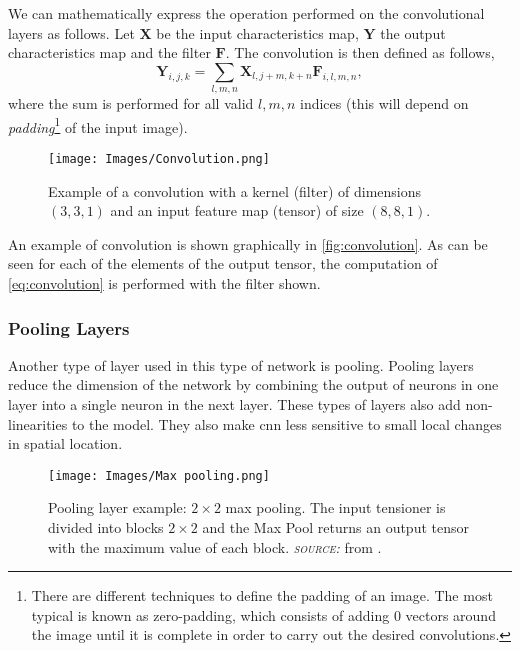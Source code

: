 We can mathematically express the operation performed on the convolutional
layers as follows. Let \(\mathbf{X}\) be the input characteristics map,
\(\mathbf{Y}\) the output characteristics map and the filter
\(\mathbf{F}\). The convolution is then defined as follows,
\begin{equation} \label{eq:convolution}
  \mathbf{Y}_{i, j, k} =
  \sum_{l, m, n} \mathbf{X}_{l, j + m, k + n}\mathbf{F}_{i, l, m, n},
\end{equation}
where the sum is performed for all valid \(l, m, n\) indices (this will depend
on \emph{padding}\footnote{There are different techniques to define the
  padding of an image. The most typical is known as zero-padding, which
  consists of adding 0 vectors around the image until it is complete in order
  to carry out the desired convolutions.} of the input image).

\begin{figure}[ht]
  \centering
  \texttt{[image: Images/Convolution.png]}
  \caption[Example of a convolution]{Example of a convolution with a kernel
    (filter) of dimensions \((3, 3, 1)\) and an input feature map (tensor) of
    size \((8, 8, 1)\).}
  \label{fig:convolution}
\end{figure}

An example of convolution is shown graphically in \vref{fig:convolution}. As
can be seen for each of the elements of the output tensor, the computation of
\vref{eq:convolution} is performed with the filter shown.

\subsubsection{Pooling Layers}
Another type of layer used in this type of network is pooling. Pooling layers
reduce the dimension of the network by combining the output of neurons in one
layer into a single neuron in the next layer. These types of layers also add
non-linearities to the model. They also make \gls{cnn} less sensitive to small
local changes in spatial location.

\begin{figure}[ht]
  \centering
  \texttt{[image: Images/Max pooling.png]}
  \caption[Pooling layer example: max pooling]{Pooling layer example:
    \(2 \times 2\) max pooling. The input tensioner is divided into blocks
    \(2 \times 2\) and the Max Pool returns an output tensor with the maximum
    value of each block. \textsc{\textsl{source:}} from
    .}\label{fig:max-pool}
\end{figure}

